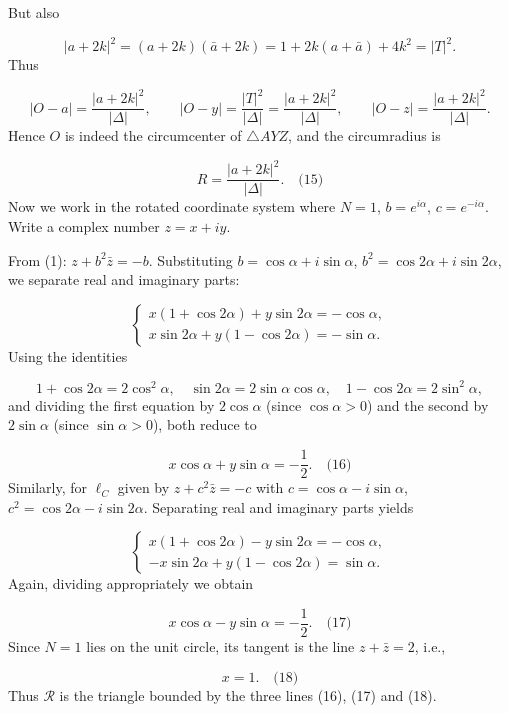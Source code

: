 But also\par
\[
|a+2k|^2 = (a+2k)(\bar a+2k) = 1 + 2k(a+\bar a) + 4k^2 = |T|^2.
\]
Thus\par
\[
|O - a| = \frac{|a+2k|^2}{|\Delta|},\qquad
|O - y| = \frac{|T|^2}{|\Delta|} = \frac{|a+2k|^2}{|\Delta|},\qquad
|O - z| = \frac{|a+2k|^2}{|\Delta|}.
\]
Hence \(O\) is indeed the circumcenter of \(\triangle AYZ\), and the circumradius is\par
\[
R = \frac{|a+2k|^2}{|\Delta|}. \quad\text{(15)}
\]
\smallskip
{}
Now we work in the rotated coordinate system where \(N=1\), \(b=e^{i\alpha}\), \(c=e^{-i\alpha}\). Write a complex number \(z = x + iy\).\par
{}
From (1): \(z + b^2\bar{z} = -b\). Substituting \(b = \cos\alpha + i\sin\alpha\), \(b^2 = \cos2\alpha + i\sin2\alpha\), we separate real and imaginary parts:\par
\[
\begin{cases}
x(1+\cos2\alpha) + y\sin2\alpha = -\cos\alpha, \\[2mm]
x\sin2\alpha + y(1-\cos2\alpha) = -\sin\alpha.
\end{cases}
\]
Using the identities\par
\[
1+\cos2\alpha = 2\cos^2\alpha,\quad \sin2\alpha = 2\sin\alpha\cos\alpha,\quad 1-\cos2\alpha = 2\sin^2\alpha,
\]
and dividing the first equation by \(2\cos\alpha\) (since \(\cos\alpha>0\)) and the second by \(2\sin\alpha\) (since \(\sin\alpha>0\)), both reduce to\par
\[
x\cos\alpha + y\sin\alpha = -\frac12. \quad\text{(16)}
\]
Similarly, for \(\ell_C\) given by \(z + c^2\bar{z} = -c\) with \(c = \cos\alpha - i\sin\alpha\), \(c^2 = \cos2\alpha - i\sin2\alpha\). Separating real and imaginary parts yields\par
\[
\begin{cases}
x(1+\cos2\alpha) - y\sin2\alpha = -\cos\alpha, \\[2mm]
- x\sin2\alpha + y(1-\cos2\alpha) = \sin\alpha.
\end{cases}
\]
Again, dividing appropriately we obtain\par
\[
x\cos\alpha - y\sin\alpha = -\frac12. \quad\text{(17)}
\]
Since \(N=1\) lies on the unit circle, its tangent is the line \(z + \bar{z} = 2\), i.e.,\par
\[
x = 1. \quad\text{(18)}
\]
Thus \(\mathcal{R}\) is the triangle bounded by the three lines (16), (17) and (18).\par
